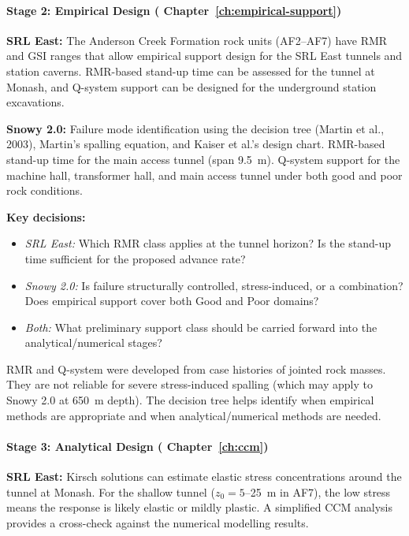 \paragraph{Stage 2: Empirical Design ( Chapter~\ref{ch:empirical-support})}

\textbf{SRL East:} The Anderson Creek Formation rock units (AF2--AF7) have RMR and GSI ranges that allow empirical support design for the SRL East tunnels and station caverns. RMR-based stand-up time can be assessed for the tunnel at Monash, and Q-system support can be designed for the underground station excavations.

\textbf{Snowy 2.0:} Failure mode identification using the decision tree (Martin et al., 2003), Martin's spalling equation, and Kaiser et al.'s design chart. RMR-based stand-up time for the main access tunnel (span 9.5~m). Q-system support for the machine hall, transformer hall, and main access tunnel under both good and poor rock conditions.

\textbf{Key decisions:}
\begin{itemize}[nosep]
 \item \textit{SRL East:} Which RMR class applies at the tunnel horizon? Is the stand-up time sufficient for the proposed advance rate?
 \item \textit{Snowy 2.0:} Is failure structurally controlled, stress-induced, or a combination? Does empirical support cover both Good and Poor domains?
 \item \textit{Both:} What preliminary support class should be carried forward into the analytical/numerical stages?
\end{itemize}

\begin{warnbox}
RMR and Q-system were developed from case histories of jointed rock masses. They are not reliable for severe stress-induced spalling (which may apply to Snowy 2.0 at 650~m depth). The decision tree helps identify when empirical methods are appropriate and when analytical/numerical methods are needed.
\end{warnbox}

\paragraph{Stage 3: Analytical Design ( Chapter~\ref{ch:ccm})}

\textbf{SRL East:} Kirsch solutions can estimate elastic stress concentrations around the tunnel at Monash. For the shallow tunnel ($z_0 = 5$--25~m in AF7), the low stress means the response is likely elastic or mildly plastic. A simplified CCM analysis provides a cross-check against the numerical modelling results.


